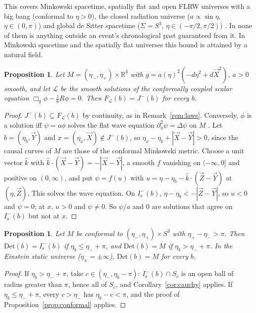 \documentclass[11pt]{article}
\newtheorem{proposition}[theorem]{Proposition}
\theoremstyle{definition}
\newcommand{\Is}{I^-_{\mathrm s}}
\newcommand{\Det}{\mathrm{Det}}
\begin{document}
This covers Minkowski spacetime, spatially flat and open FLRW universes with
a big bang (conformal to $\eta>0$), the closed radiation universe
($a\propto\sin\eta$, $\eta\in(0,\pi)$) and global de Sitter spacetime ($\Sigma=S^3$,
$\eta\in(-\pi/2,\pi/2)$) \citep{HE1973}. In none of them is anything outside an
event's chronological past guaranteed from it. In Minkowski spacetime and the
spatially flat universes this bound is attained by a natural field.

\begin{proposition}\label{prop:sharp}
Let $M=(\eta_-,\eta_+)\times\mathbb R^3$ with $g=a(\eta)^2(-d\eta^2+d\vec X^2)$,
$a>0$ smooth, and let $\mathcal L$ be the smooth solutions of the conformally
coupled scalar equation $\Box_g\phi-\tfrac16R\phi=0$. Then
$F_{\mathcal L}(b)=J^-(b)$ for every $b$.
\end{proposition}

\begin{proof}
$J^-(b)\subseteq F_{\mathcal L}(b)$ by continuity, as in
Remark~\ref{rem:laws}. Conversely, $\phi$ is a solution iff $\psi=a\phi$
solves the flat wave equation $\partial_\eta^2\psi=\Delta\psi$ on $M$
\citep[app.~D]{Wald1984}. Let $b=(\eta_b,\vec Y)$ and $x=(\eta_x,\vec X)\notin
J^-(b)$, so $\eta_x-\eta_b+|\vec X-\vec Y|>0$, since the causal curves of $M$
are those of the conformal Minkowski metric. Choose a unit vector $\hat k$
with $\hat k\cdot(\vec X-\vec Y)=-|\vec X-\vec Y|$, a smooth $f$ vanishing on
$(-\infty,0]$ and positive on $(0,\infty)$, and put $\psi=f(u)$ with
$u=\eta-\eta_b-\hat k\cdot(\vec Z-\vec Y)$ at $(\eta,\vec Z)$. This solves the
wave equation. On $\Is(b)$, $\eta-\eta_b<-|\vec Z-\vec Y|$, so $u<0$ and
$\psi=0$; at $x$, $u>0$ and $\psi\neq0$. So $\psi/a$ and $0$ are solutions that
agree on $\Is(b)$ but not at $x$.
\end{proof}


\begin{proposition}\label{prop:dust}
Let $M$ be conformal to $(\eta_-,\eta_+)\times S^3$ with $\eta_+-\eta_->\pi$.
Then $\Det(b)=\Is(b)$ if $\eta_b\le\eta_-+\pi$, and $\Det(b)=M$ if
$\eta_b>\eta_-+\pi$. In the Einstein static universe ($\eta_\pm=\pm\infty$),
$\Det(b)=M$ for every $b$.
\end{proposition}

\begin{proof}
If $\eta_b>\eta_-+\pi$, take $c\in(\eta_-,\eta_b-\pi)$: $\Is(b)\cap S_c$ is an open
ball of radius greater than $\pi$, hence all of $S_c$, and
Corollary~\ref{cor:cauchy} applies. If $\eta_b\le\eta_-+\pi$, every $c>\eta_-$
has $\eta_b-c<\pi$, and the proof of Proposition~\ref{prop:conformal} applies.
\end{proof}
\end{document}
